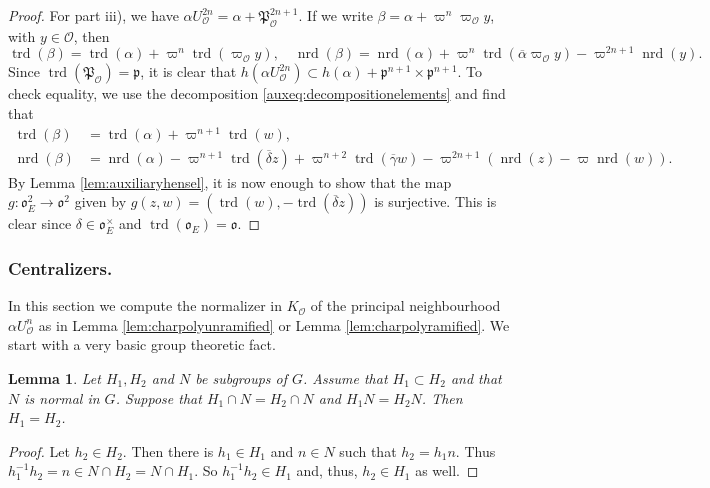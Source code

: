 \documentclass{article}
\newtheorem{lem}{Lemma}[section]
\theoremstyle{named}
\renewcommand{\O}{\mathcal{O}}
\renewcommand{\o}{\mathfrak{o}}
\renewcommand{\P}{\mathfrak{P}}
\newcommand{\p}{\mathfrak{p}}
\DeclareMathOperator{\nrd}{nrd}
\DeclareMathOperator{\trd}{trd}
\begin{document}
\begin{proof}
For part iii), we have $\alpha U_\O^{2n} = \alpha + \P_\O^{2n + 1}$. If we write $\beta = \alpha + \varpi^n \varpi_\O y$, with $y \in \O$, then 
\begin{equation*}
    \trd(\beta) = \trd(\alpha) + \varpi^n \trd(\varpi_\O y), \quad \nrd(\beta) = \nrd(\alpha) + \varpi^n \trd(\overline{\alpha}\varpi_\O y) - \varpi^{2n + 1} \nrd(y).
\end{equation*}
Since $\trd(\P_\O) = \p$, it is clear that $h(\alpha U_\O^{2n}) \subset h(\alpha) + \p^{n + 1} \times \p^{n + 1}$. To check equality, we use the decomposition \eqref{auxeq:decompositionelements} and find that
\begin{equation*}
\begin{aligned}
    \trd(\beta) & = \trd(\alpha) + \varpi^{n + 1} \trd(w),\\
    \nrd(\beta) & = \nrd(\alpha) -\varpi^{n+1}\trd(\overline{\delta}z) + \varpi^{n + 2}\trd(\overline{\gamma}w) - \varpi^{2n + 1}(\nrd(z) - \varpi \nrd(w)).
\end{aligned}
\end{equation*} 
By Lemma \ref{lem:auxiliaryhensel}, it is now enough to show that the map $g: \o_E^2 \rightarrow \o^2$ given by $g(z, w) = (\trd(w), -\trd(\overline{\delta}z))$ is surjective. This is clear since $\delta \in \o_E^\times$ and $\trd(\o_E) = \o$.
\end{proof}

\subsubsection{Centralizers.}

In this section we compute the normalizer in $K_\O$ of the principal neighbourhood $\alpha U_\O^n$ as in Lemma \ref{lem:charpolyunramified} or Lemma \ref{lem:charpolyramified}. We start with a very basic group theoretic fact. 
\begin{lem}\label{lem:basicgrouptheoreticlemma}
Let $H_1, H_2$ and $N$ be subgroups of $G$. Assume that $H_1 \subset H_2$ and that $N$ is normal in $G$. Suppose that $H_1 \cap N = H_2 \cap N$ and $H_1N = H_2 N$. Then $H_1 = H_2$.
\end{lem}
\begin{proof}
Let $h_2 \in H_2$. Then there is $h_1 \in H_1$ and $n \in N$ such that $h_2 = h_1 n$. Thus $h_1^{-1}h_2 = n \in N\cap H_2 = N \cap H_1$. So $h_1^{-1}h_2 \in H_1$ and, thus, $h_2 \in H_1$ as well. 
\end{proof}
\end{document}
